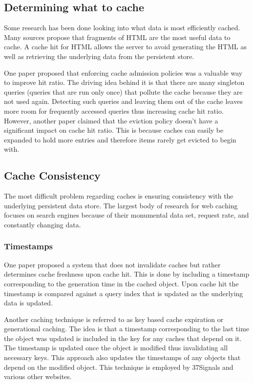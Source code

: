 \documentclass[12pt]{article}
\begin{document}
\subsection{Determining what to cache}
Some research has been done looking into what data is most efficiently cached.
Many sources propose that fragments of HTML are the most useful data to cache.\cite{comparisonOfCachingSolutions}\cite{scalableConsistentCaching}
A cache hit for HTML allows the server to avoid generating the HTML as well as retrieving the underlying data from the persistent store.\cite{howBasecampGotSoFast}

One paper proposed that enforcing cache admission policies was a valuable way to improve hit ratio.\cite{cacheAdmissionPolicies}
The driving idea behind it is that there are many singleton queries (queries that are run only once) that pollute the cache because they are not used again.
Detecting such queries and leaving them out of the cache leaves more room for frequently accessed queries thus increasing cache hit ratio.
However, another paper claimed that the eviction policy doesn't have a significant impact on cache hit ratio.\cite{refreshingPerspectiveSearch}
This is because caches can easily be expanded to hold more entries and therefore items rarely get evicted to begin with.\cite{refreshingPerspectiveSearch}

\subsection{Cache Consistency}
The most difficult problem regarding caches is ensuring consistency with the underlying persistent data store.
The largest body of research for web caching focuses on search engines because of their monumental data set, request rate, and constantly changing data.

\subsubsection{Timestamps}
One paper proposed a system that does not invalidate caches but rather determines cache freshness upon cache hit.\cite{cacheInvalidationWebSearch}
This is done by including a timestamp corresponding to the generation time in the cached object.
Upon cache hit the timestamp is compared against a query index that is updated as the underlying data is updated.

Another caching technique is referred to as key based cache expiration\cite{keyBasedCacheExpiration} or generational caching\cite{generationalCaching}.
The idea is that a timestamp corresponding to the last time the object was updated is included in the key for any caches that depend on it.
The timestamp is updated once the object is modified thus invalidating all necessary keys.
This approach also updates the timestamps of any objects that depend on the modified object.
This technique is employed by 37Signals and various other websites.\cite{keyBasedCacheExpiration}
\end{document}
